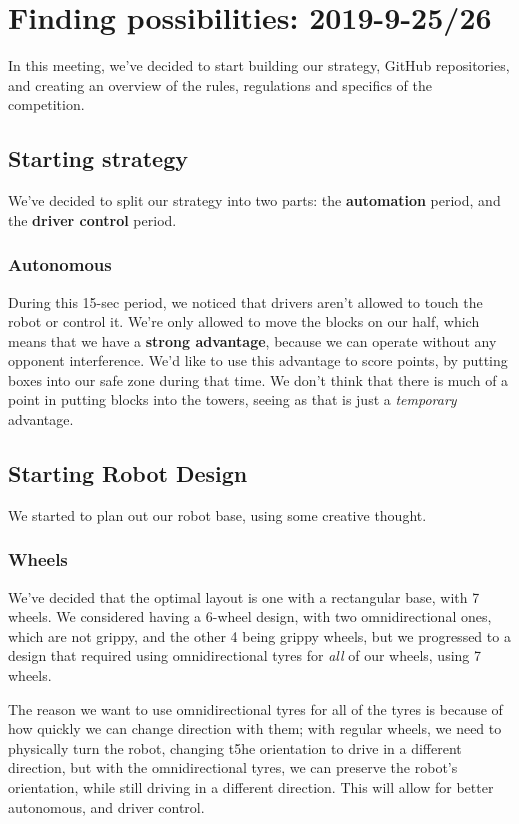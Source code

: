 \documentclass[../../main.tex]{subfiles}
\begin{document}
\section{\textbf{Finding possibilities}: 2019-9-25/26}
In this meeting, we've decided to start building our strategy, GitHub repositories, and creating an overview of the rules, regulations and specifics of the competition.

\subsection{Starting strategy}
We've decided to split our strategy into two parts: the \textbf{automation} period, and the \textbf{driver control} period.

\subsubsection{Autonomous}
During this 15-sec period, we noticed that drivers aren't allowed to touch the robot or control it. We're only allowed to move the blocks on our half, which means that we have a \textbf{strong advantage}, because we can operate without any opponent interference. We'd like to use this advantage to score points, by putting boxes into our safe zone during that time. We don't think that there is much of a point in putting blocks into the towers, seeing as that is just a \textit{temporary} advantage.

\subsection{Starting Robot Design}
We started to plan out our robot base, using some creative thought.

\subsubsection{Wheels}
We've decided that the optimal layout is one with a rectangular base, with 7 wheels. We considered having a 6-wheel design, with two omnidirectional ones, which are not grippy, and the other 4 being grippy wheels, but we progressed to a design that required using omnidirectional tyres for \textit{all} of our wheels, using 7 wheels.

The reason we want to use omnidirectional tyres for all of the tyres is because of how quickly we can change direction with them; with regular wheels, we need to physically turn the robot, changing t5he orientation to drive in a different direction, but with the omnidirectional tyres, we can preserve the robot's orientation, while still driving in a different direction. This will allow for better autonomous, and driver control.
\end{document}
